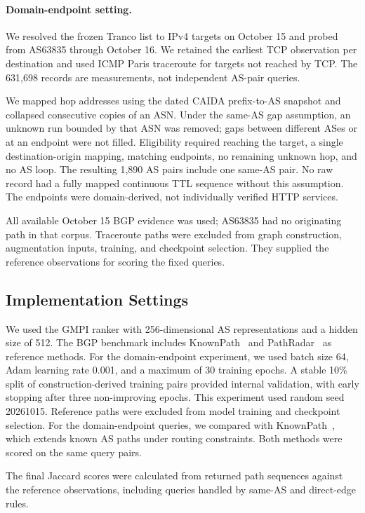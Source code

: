 \documentclass[sigconf,anonymous,review]{acmart}
\begin{document}
\paragraph{Domain-endpoint setting.}
We resolved the frozen Tranco list to IPv4 targets on October 15 and probed
from AS63835 through October 16. We retained the earliest TCP observation
per destination and used ICMP Paris traceroute for targets not reached by
TCP. The 631,698 records are measurements, not independent AS-pair queries.

We mapped hop addresses using the dated CAIDA prefix-to-AS snapshot and
collapsed consecutive copies of an ASN. Under the same-AS gap assumption,
an unknown run bounded by that ASN was removed; gaps between different ASes or at
an endpoint were not filled. Eligibility required reaching the target, a
single destination-origin mapping, matching endpoints, no remaining unknown
hop, and no AS loop. The resulting 1,890 AS pairs include one same-AS pair.
No raw record had a fully mapped continuous TTL sequence without this
assumption. The endpoints were domain-derived, not individually verified
HTTP services.

All available October 15 BGP evidence was used; AS63835 had no originating
path in that corpus. Traceroute paths were excluded from graph construction,
augmentation inputs, training, and checkpoint selection. They supplied the
reference observations for scoring the fixed queries.

\subsection{Implementation Settings}
\label{sec:implementation}

We used the GMPI ranker with 256-dimensional AS representations and a hidden
size of 512. The BGP benchmark includes KnownPath~\cite{qiu2005path} and
PathRadar~\cite{11044440} as reference methods.
For the domain-endpoint experiment, we used batch size 64,
Adam learning rate 0.001, and a maximum of 30 training epochs. A stable 10\%
split of construction-derived training pairs provided internal validation,
with early stopping after three non-improving epochs. This experiment used
random seed 20261015. Reference paths were excluded from model training and checkpoint
selection. For the domain-endpoint queries, we compared with
KnownPath~\cite{qiu2005path}, which extends known AS paths under routing
constraints. Both methods were scored on the same query pairs.

The final Jaccard scores were calculated from returned path sequences
against the reference observations, including queries handled by same-AS
and direct-edge rules.
\end{document}
